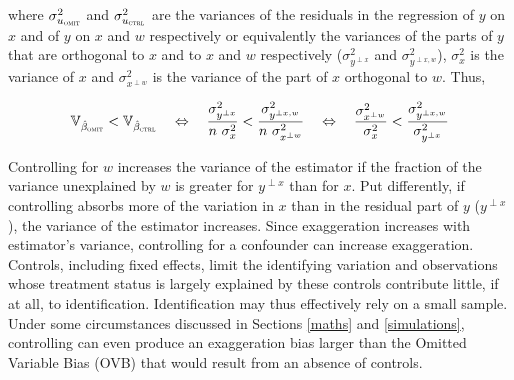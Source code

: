 			where $\sigma^{2}_{u_{\textsc{omit}}}$ and $\sigma^{2}_{u_{\textsc{ctrl}}}$ are the variances of the residuals in the regression of $y$ on $x$ and of $y$ on $x$ and $w$ respectively or equivalently the variances of the parts of $y$ that are orthogonal to $x$ and to $x$ and $w$ respectively ($\sigma^{2}_{y^{\perp x}}$ and $\sigma^{2}_{y^{\perp x, w}}$), $\sigma^{2}_{x}$ is the variance of $x$ and $\sigma^{2}_{x^{\perp w}}$ is the variance of the part of $x$ orthogonal to $w$. Thus,
			
			\[
				\mathbb{V}_{\hat{\beta}_{\textsc{omit}}} <  \mathbb{V}_{\hat{\beta}_{\textsc{ctrl}}}
                   		\quad \Leftrightarrow \quad 
				\dfrac{\sigma^{2}_{y^{\perp x}}}{n \ \sigma_{x}^{2}} < \dfrac{\sigma^{2}_{y^{\perp x, w}}}{n \ \sigma_{x^{\perp w}}^{2}}
				\quad \Leftrightarrow \quad 
				\dfrac{\sigma^{2}_{x^{\perp w}}}{\sigma_{x}^{2}} <
				\dfrac{\sigma^{2}_{y^{\perp x, w}}}{ \sigma_{y^{\perp x}}^{2}}
			\]
			
			Controlling for $w$ increases the variance of the estimator if the fraction of the variance unexplained by $w$ is greater for $y^{\perp x}$ than for $x$. Put differently, if controlling absorbs more of the variation in $x$ than in the residual part of $y$ ($y^{\perp x}$), the variance of the estimator increases. Since exaggeration increases with estimator's variance, controlling for a confounder can increase exaggeration. Controls, including fixed effects, limit the identifying variation and observations whose treatment status is largely explained by these controls contribute little, if at all, to identification. Identification may thus effectively rely on a small sample. Under some circumstances discussed in Sections \ref{maths} and \ref{simulations}, controlling can even produce an exaggeration bias larger than the Omitted Variable Bias (OVB) that would result from an absence of controls. 
			
